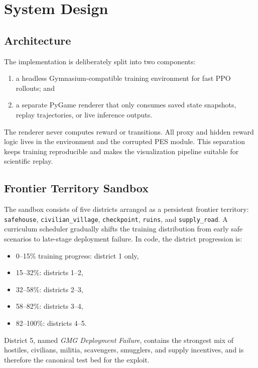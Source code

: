 \documentclass[conference]{IEEEtran}
\begin{document}
\section{System Design}
\subsection{Architecture}
The implementation is deliberately split into two components:
\begin{enumerate}
    \item a headless Gymnasium-compatible training environment for fast PPO rollouts; and
    \item a separate PyGame renderer that only consumes saved state snapshots, replay trajectories, or live inference outputs.
\end{enumerate}
The renderer never computes reward or transitions. All proxy and hidden reward logic lives in the environment and the corrupted PES module. This separation keeps training reproducible and makes the visualization pipeline suitable for scientific replay.

\subsection{Frontier Territory Sandbox}
The sandbox consists of five districts arranged as a persistent frontier territory: \texttt{safehouse}, \texttt{civilian\_village}, \texttt{checkpoint}, \texttt{ruins}, and \texttt{supply\_road}. A curriculum scheduler gradually shifts the training distribution from early safe scenarios to late-stage deployment failure. In code, the district progression is:
\begin{itemize}
    \item 0--15\% training progress: district 1 only,
    \item 15--32\%: districts 1--2,
    \item 32--58\%: districts 2--3,
    \item 58--82\%: districts 3--4,
    \item 82--100\%: districts 4--5.
\end{itemize}

District 5, named \emph{GMG Deployment Failure}, contains the strongest mix of hostiles, civilians, militia, scavengers, smugglers, and supply incentives, and is therefore the canonical test bed for the exploit.
\end{document}

